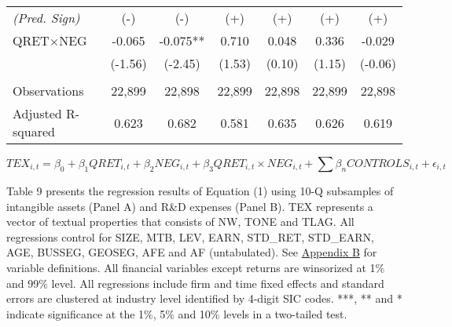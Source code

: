 \begin{table}[H]
\begin{center}
\begin{tabular}{lcccccc}
  		\rowcolor[rgb]{ .933,  .925,  .882} \textit{(Pred. Sign)} & (-) & (-) & (+) & (+) & (+) & (+) \\
  		\rowcolor[rgb]{ .933,  .925,  .882} QRET$\times$NEG & -0.065 & -0.075** & 0.710 & 0.048 & 0.336 & -0.029 \\
  		\rowcolor[rgb]{ .933,  .925,  .882}  & (-1.56) & (-2.45) & (1.53) & (0.10) & (1.15) & (-0.06) \\
  		&   &   &   &   &   &  \\
  		Observations & 22,899 & 22,898 & 22,899 & 22,898 & 22,899 & 22,898 \\
  		Adjusted R-squared & 0.623 & 0.682 & 0.581 & 0.635 & 0.626 & 0.619 \\
  		
  		\bottomrule
  		\bottomrule
  	\end{tabular}%
  \end{center}
\begin{footnotesize}
	\setcounter{equation}{0}
	\begin{equation}
		TEX_{i,t}=\beta_0+\beta_1QRET_{i,t}+\beta_2NEG_{i,t}+\beta_3QRET_{i,t}\times NEG_{i,t}+\sum\beta_nCONTROLS_{i,t}+\epsilon_{i,t}
	\end{equation}
	
	\noindent Table 9 presents the regression results of Equation (1) using 10-Q subsamples of intangible assets (Panel A) and R\&D expenses (Panel B). TEX represents a vector of textual properties that consists of NW, TONE and TLAG. All regressions control for SIZE, MTB, LEV, EARN, STD\_RET, STD\_EARN, AGE, BUSSEG, GEOSEG, AFE and AF (untabulated). See \hyperref[appb]{Appendix B} for variable definitions. All financial variables except returns are winsorized at 1\% and 99\% level. All regressions include firm and time fixed effects and standard errors are clustered at industry level identified by 4-digit SIC codes. ***, ** and * indicate significance at the 1\%, 5\% and 10\% levels in a two-tailed test.
\end{footnotesize}
\end{table}%
